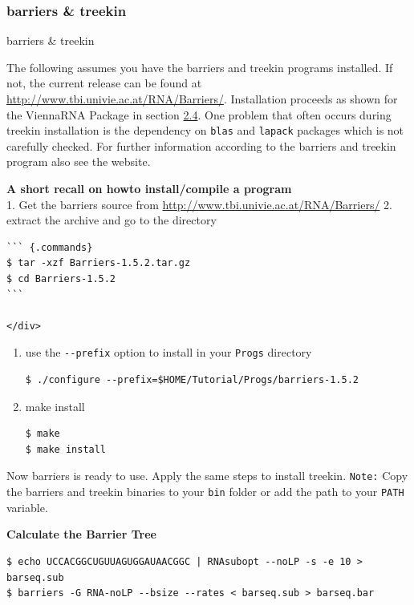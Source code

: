 \documentclass[]{article}
\providecommand{\tightlist}{%
  \setlength{\itemsep}{0pt}\setlength{\parskip}{0pt}}
\begin{document}
\subsubsection{barriers \& treekin}{barriers \& treekin}\label{barriers-treekin}

The following assumes you have the barriers and treekin programs
installed. If not, the current release can be found at
\url{http://www.tbi.univie.ac.at/RNA/Barriers/}. Installation proceeds
as shown for the ViennaRNA Package in section
\hyperref[x1-80002.4]{2.4}. One problem that often occurs during treekin
installation is the dependency on \texttt{blas} and \texttt{lapack}
packages which is not carefully checked. For further information
according to the barriers and treekin program also see the website.

\textbf{A short recall on howto install/compile a program}\\
1. Get the barriers source from
\url{http://www.tbi.univie.ac.at/RNA/Barriers/} 2. extract the archive
and go to the directory

\begin{verbatim}
``` {.commands}
$ tar -xzf Barriers-1.5.2.tar.gz
$ cd Barriers-1.5.2
```

</div>
\end{verbatim}

\begin{enumerate}
\def\labelenumi{\arabic{enumi}.}
\setcounter{enumi}{2}
\tightlist
\item
  use the \texttt{-\/-prefix} option to install in your \texttt{Progs}
  directory

\begin{verbatim}
$ ./configure --prefix=$HOME/Tutorial/Progs/barriers-1.5.2
\end{verbatim}
\item
  make install

\begin{verbatim}
$ make
$ make install
\end{verbatim}
\end{enumerate}

Now barriers is ready to use. Apply the same steps to install treekin.
\texttt{Note:} Copy the barriers and treekin binaries to your
\texttt{bin} folder or add the path to your \texttt{PATH} variable.

\textbf{Calculate the Barrier Tree}\\

\begin{verbatim}
$ echo UCCACGGCUGUUAGUGGAUAACGGC | RNAsubopt --noLP -s -e 10 > barseq.sub
$ barriers -G RNA-noLP --bsize --rates < barseq.sub > barseq.bar
\end{verbatim}
\end{document}
